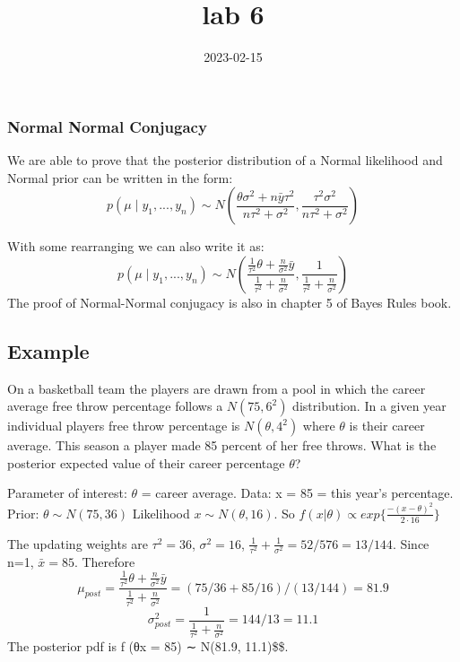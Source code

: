 \documentclass[
]{article}
\title{lab 6}
\author{}
\date{\vspace{-2.5em}2023-02-15}
\begin{document}
\maketitle

\hypertarget{normal-normal-conjugacy}{%
\subsubsection{Normal Normal Conjugacy}\label{normal-normal-conjugacy}}

We are able to prove that the posterior distribution of a Normal
likelihood and Normal prior can be written in the form: \[
p(\mu \mid y_{1},...,y_{n}) \sim N\left(\frac{\theta \sigma^2+n\bar{y}\tau^2}{n\tau^2+\sigma^2},\frac{\tau^2\sigma^2}{n\tau^2+\sigma^2} \right)
\]

With some rearranging we can also write it as: \[
p(\mu \mid y_{1},...,y_{n}) \sim N\left(\frac{\frac{1}{\tau^2}\theta + \frac{n}{\sigma^2} \bar{y}}{\frac{1}{\tau^2}+\frac{n}{\sigma^2}}, \frac{1}{\frac{1}{\tau^2} + \frac{n}{\sigma^2}} \right)
\] The proof of Normal-Normal conjugacy is also in chapter 5 of Bayes
Rules book.

\hypertarget{example}{%
\subsection{Example}\label{example}}

On a basketball team the players are drawn from a pool in which the
career average free throw percentage follows a \(N(75, 6^2)\)
distribution. In a given year individual players free throw percentage
is \(N(\theta, 4^2)\) where \(\theta\) is their career average. This
season a player made 85 percent of her free throws. What is the
posterior expected value of their career percentage \(\theta\)?

Parameter of interest: \(\theta\) = career average. Data: x = 85 = this
year's percentage. Prior: \(\theta \sim N(75, 36)\) Likelihood
\(x \sim N(\theta, 16)\). So
\(f(x|\theta) \propto exp\{\frac{−(x−\theta)^2}{2·16}\}\)

The updating weights are \(\tau^2 = 36\), \(\sigma^2 = 16\),
\(\frac{1}{\tau^2} + \frac{1}{\sigma^2} = 52/576 = 13/144\). Since n=1,
\(\bar{x}=85\). Therefore
\[\mu_{post} = \frac{\frac{1}{\tau^2}\theta + \frac{n}{\sigma^2} \bar{y}}{\frac{1}{\tau^2}+\frac{n}{\sigma^2}} = (75/36 + 85/16)/(13/144) = 81.9\]
\[\sigma^2_{post} = \frac{1}{\frac{1}{\tau^2} + \frac{n}{\sigma^2}} = 144/13 = 11.1\]
The posterior pdf is f (θ\textbar x = 85) ∼ N(81.9, 11.1)\$\$.
\end{document}
